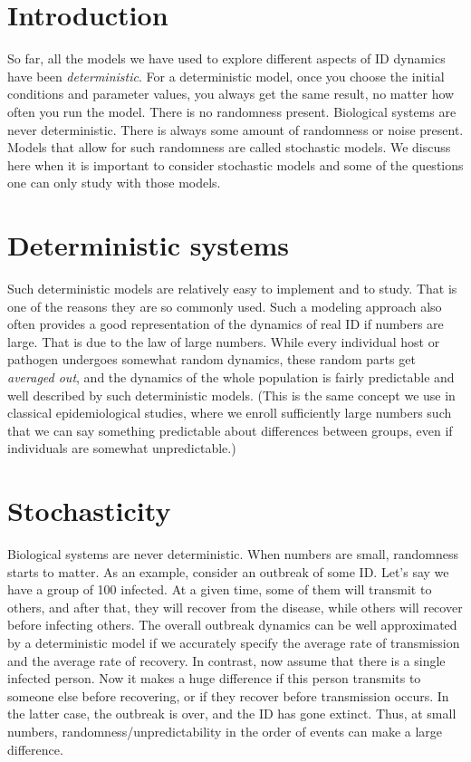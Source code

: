 \documentclass[]{book}
\theoremstyle{definition}
\theoremstyle{definition}
\theoremstyle{definition}
\theoremstyle{remark}
\begin{document}
\section{Introduction}\label{introduction-12}

So far, all the models we have used to explore different aspects of ID
dynamics have been \emph{deterministic}. For a deterministic model, once
you choose the initial conditions and parameter values, you always get
the same result, no matter how often you run the model. There is no
randomness present. Biological systems are never deterministic. There is
always some amount of randomness or noise present. Models that allow for
such randomness are called stochastic models. We discuss here when it is
important to consider stochastic models and some of the questions one
can only study with those models.

\section{Deterministic systems}\label{deterministic-systems}

Such deterministic models are relatively easy to implement and to study.
That is one of the reasons they are so commonly used. Such a modeling
approach also often provides a good representation of the dynamics of
real ID if numbers are large. That is due to the law of large numbers.
While every individual host or pathogen undergoes somewhat random
dynamics, these random parts get \emph{averaged out}, and the dynamics
of the whole population is fairly predictable and well described by such
deterministic models. (This is the same concept we use in classical
epidemiological studies, where we enroll sufficiently large numbers such
that we can say something predictable about differences between groups,
even if individuals are somewhat unpredictable.)

\section{Stochasticity}\label{stochasticity}

Biological systems are never deterministic. When numbers are small,
randomness starts to matter. As an example, consider an outbreak of some
ID. Let's say we have a group of 100 infected. At a given time, some of
them will transmit to others, and after that, they will recover from the
disease, while others will recover before infecting others. The overall
outbreak dynamics can be well approximated by a deterministic model if
we accurately specify the average rate of transmission and the average
rate of recovery. In contrast, now assume that there is a single
infected person. Now it makes a huge difference if this person transmits
to someone else before recovering, or if they recover before
transmission occurs. In the latter case, the outbreak is over, and the
ID has gone extinct. Thus, at small numbers, randomness/unpredictability
in the order of events can make a large difference.
\end{document}
